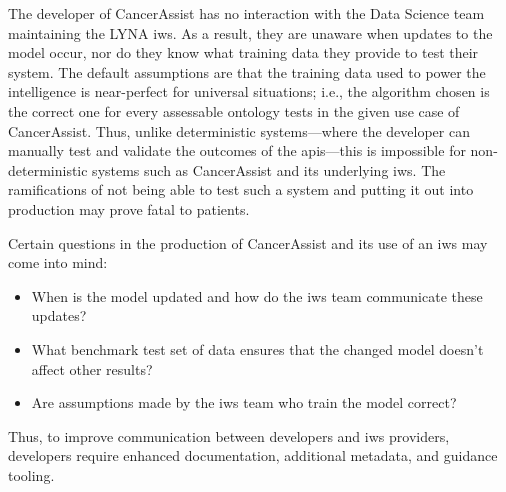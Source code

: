 The developer of CancerAssist has no interaction with the Data Science team maintaining the LYNA \gls{iws}. As a result, they are unaware when updates to the model occur, nor do they know what training data they provide to test their system. The default assumptions are that the training data used to power the intelligence is near-perfect for universal situations; i.e., the algorithm chosen is the correct one for every assessable ontology tests in the given use case of CancerAssist. Thus, unlike deterministic systems---where the developer can manually test and validate the outcomes of the \glspl{api}---this is impossible for non-deterministic systems such as CancerAssist and its underlying \gls{iws}. The ramifications of not being able to test such a system and putting it out into production may prove fatal to patients.

Certain questions in the production of CancerAssist and its use of an \gls{iws} may come into mind:

\begin{itemize}%
  \item When is the model updated and how do the \gls{iws} team communicate these updates?
  \item What benchmark test set of data ensures that the changed model doesn't affect other results?
  \item Are assumptions made by the \gls{iws} team who train the model correct?
\end{itemize}

Thus, to improve communication between developers and \gls{iws} providers, developers require enhanced documentation, additional metadata, and guidance tooling. 

